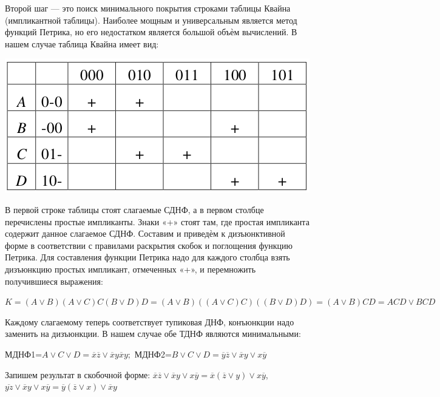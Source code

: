\documentclass{article}
\begin{document}
Второй шаг — это поиск минимального покрытия строками таблицы Квайна (импликантной таблицы). Наиболее мощным и универсальным является метод функций Петрика, но его недостатком является большой объѐм вычислений. В нашем случае таблица Квайна имеет вид:

\begin{center}
    \includegraphics{images/52.png}
\end{center}

В первой строке таблицы стоят слагаемые СДНФ, а в первом столбце перечислены простые импликанты. Знаки «+» стоят там, где простая импликанта содержит данное слагаемое СДНФ. Составим и приведѐм к дизъюнктивной форме в соответствии с правилами раскрытия скобок и поглощения функцию Петрика. Для составления функции Петрика надо для каждого столбца взять дизъюнкцию простых импликант, отмеченных «+», и перемножить получившиеся выражения:

$K = (A \lor B)(A \lor C)C(B \lor D)D = (A \lor B)((A \lor C)C)((B \lor D)D) = (A \lor B)CD = ACD \lor BCD$

Каждому слагаемому теперь соответствует тупиковая ДНФ, конъюнкции надо заменить на дизъюнкции. В нашем случае обе ТДНФ являются минимальными:

МДНФ1=$A \lor C \lor D = \overline{x} \overline{z} \lor \overline{x} y \overline{x} y;$ МДНФ2=$B \lor C \lor D = \overline{y} \overline{z} \lor \overline{x} y \lor x \overline{y}$

Запишем результат в скобочной форме: $\overline{x} \overline{z} \lor \overline{x} y \lor x \overline{y} = \overline{x} (\overline{z} \lor y) \lor x \overline{y}$, $\overline{yz} \lor \overline{x} y \lor x \overline{y} = \overline{y} (\overline{z} \lor x) \lor \overline{x} y$
\end{document}
